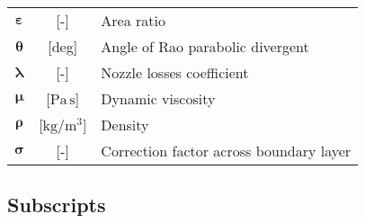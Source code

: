 \begin{multicols}{2}
{\begin{xltabular}{\linewidth}{cc>{\raggedright\arraybackslash}X}
		$\boldsymbol{\varepsilon}$ & [-] & Area ratio \\
		$\boldsymbol{\theta}$ & [deg] & Angle of Rao parabolic divergent \\
		$\boldsymbol{\lambda}$ & [-] & Nozzle losses coefficient \\
		$\boldsymbol{\mu}$ & [$\textrm{Pa} \, \textrm{s}$] & Dynamic viscosity \\
		$\boldsymbol{\rho}$ & [$\textrm{kg} / \textrm{m}^3$] & Density \\
		$\boldsymbol{\sigma}$ & [-] & Correction factor across boundary layer \\
	\end{xltabular}
	\unskip
	\unpenalty
	\unpenalty}
	\unvbox\ltmcbox
\end{multicols}

\pagebreak

\subsection*{Subscripts}
\label{subsec:subscripts}
\vspace*{-3mm}

